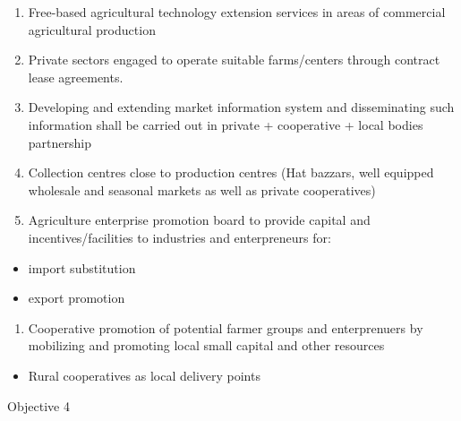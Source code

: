 \documentclass[
]{book}
\providecommand{\tightlist}{%
  \setlength{\itemsep}{0pt}\setlength{\parskip}{0pt}}
\begin{document}
\begin{itemize}
  \begin{enumerate}
  \def\labelenumi{\arabic{enumi}.}
  \setcounter{enumi}{17}
  \tightlist
  \item
    Free-based agricultural technology extension services in areas of commercial agricultural production
  \item
    Private sectors engaged to operate suitable farms/centers through contract lease agreements.
  \item
    Developing and extending market information system and disseminating such information shall be carried out in private + cooperative + local bodies partnership
  \item
    Collection centres close to production centres (Hat bazzars, well equipped wholesale and seasonal markets as well as private cooperatives)
  \item
    Agriculture enterprise promotion board to provide capital and incentives/facilities to industries and enterpreneurs for:
  \end{enumerate}

  \begin{itemize}
  \tightlist
  \item
    import substitution
  \item
    export promotion
  \end{itemize}

  \begin{enumerate}
  \def\labelenumi{\arabic{enumi}.}
  \setcounter{enumi}{22}
  \tightlist
  \item
    Cooperative promotion of potential farmer groups and enterprenuers by mobilizing and promoting local small capital and other resources
  \end{enumerate}

  \begin{itemize}
  \tightlist
  \item
    Rural cooperatives as local delivery points
  \end{itemize}
\end{itemize}

Objective 4
\end{document}

